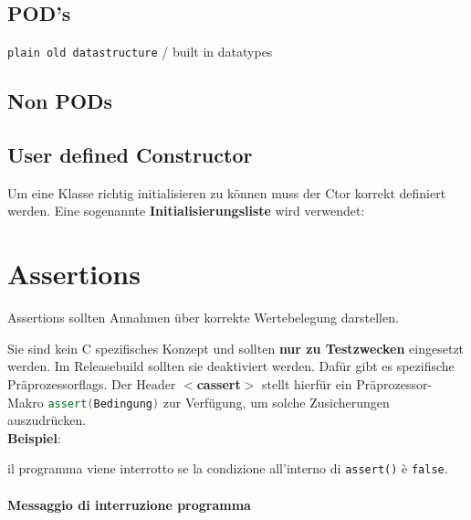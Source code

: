 \subsection{POD's}

\texttt{plain old datastructure} / built in datatypes



\subsection{Non PODs}



\subsection{User defined Constructor}\label{chap:user_ctor}

Um eine Klasse richtig initialisieren zu können muss der Ctor korrekt definiert werden. 
Eine sogenannte \textbf{Initialisierungsliste} wird verwendet:



\section{Assertions}
Assertions sollten Annahmen über korrekte Wertebelegung darstellen. 

Sie sind kein C spezifisches Konzept und sollten \textbf{nur zu Testzwecken} eingesetzt werden. 
Im Releasebuild sollten sie deaktiviert werden. 
Dafür gibt es spezifische Präprozessorflags.
Der Header \textbf{$<$cassert$>$} stellt hierfür ein Präprozessor-Makro \lstinline[language=C++]|assert(Bedingung)| zur Verfügung, um solche Zusicherungen auszudrücken.\\
\textbf{Beispiel}:

\vspace{-1em}

il programma viene interrotto se la condizione all'interno di \texttt{assert()} è \texttt{false}.

\medbreak

\noindent
\paragraph{Messaggio di interruzione programma}


